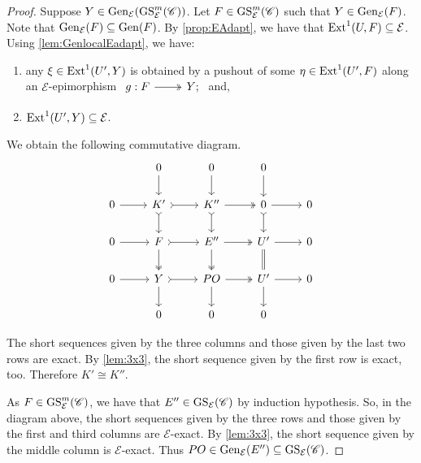 \begin{proof}
Suppose $Y \in \operatorname{Gen}_\mathcal{E}(\operatorname{GS}^{m}_{\mathcal{E}}(\mathscr{C}))$. Let $F \in \operatorname{GS}^{m}_{\mathcal{E}}(\mathscr{C})$ such that $Y \in \operatorname{Gen}_{\mathcal{E}}(F)$. Note that $\operatorname{Gen}_{\mathcal{E}}(F) \subseteq \operatorname{Gen}(F)$. By \cref{prop:EAdapt}, we have that $\operatorname{Ext}^1(U,F) \subseteq \mathcal{E}$. Using \cref{lem:GenlocalEadapt}, we have:
\begin{enumerate}[label=$\bullet$, itemsep=1mm]
    \item any $\xi \in \operatorname{Ext}^1(U',Y)$ is obtained by a pushout of some $\eta \in \operatorname{Ext}^1(U',F)$ along an $\mathcal{E}$-epimorphism $\begin{tikzcd}
	 g: F & Y;
	\arrow[two heads,from=1-1, to=1-2]
   \end{tikzcd}$ and,
   \item $\operatorname{Ext}^1(U',Y) \subseteq \mathcal{E}$.
\end{enumerate}
We obtain the following commutative diagram.
\[\begin{tikzcd}
         & 0 & 0 & 0 &  \\
	0 & K' & K''  & 0 &  0 \\
     0 & F & E'' & U' & 0 \\
      0 & Y & PO & U' & 0 \\
       & 0 & 0 & 0 & 
	\arrow[from=2-1, to=2-2]
	\arrow[tail, from=2-2, to=2-3]
	\arrow[two heads,from=2-3, to=2-4]
	\arrow[from=2-4, to=2-5]
        \arrow[from=3-1, to=3-2]
	\arrow[tail, from=3-2, to=3-3]
	\arrow[two heads,from=3-3, to=3-4]
	\arrow[from=3-4, to=3-5]
        \arrow[from=4-1, to=4-2]
	\arrow[tail, from=4-2, to=4-3]
	\arrow[two heads,from=4-3, to=4-4]
	\arrow[from=4-4, to=4-5]
        \arrow[from=4-2, to=5-2]
	\arrow[two heads, from=3-2, to=4-2]
	\arrow[tail,from=2-2, to=3-2]
	\arrow[from=1-2, to=2-2]
        \arrow[from=4-3, to=5-3]
	\arrow[two heads, from=3-3, to=4-3]
	\arrow[tail,from=2-3, to=3-3]
	\arrow[from=1-3, to=2-3]
        \arrow[from=4-4, to=5-4]
	\arrow[equals, from=3-4, to=4-4]
	\arrow[tail,from=2-4, to=3-4]
	\arrow[from=1-4, to=2-4]
\end{tikzcd} \]

The short sequences given by the three columns and those given by the last two rows are exact. By \cref{lem:3x3}, the short sequence given by the first row is exact, too. Therefore $K' \cong K''$.

As $F \in \operatorname{GS}^{m}_{\mathcal{E}}(\mathscr{C})$, we have that $E'' \in \operatorname{GS}_{\mathcal{E}}(\mathscr{C})$ by induction hypothesis. So, in the diagram above, the short sequences given by the three rows and those given by the first and third columns are $\mathcal{E}$-exact. By \cref{lem:3x3}, the short sequence given by the middle column is $\mathcal{E}$-exact. Thus $PO \in \operatorname{Gen}_\mathcal{E}(E'') \subseteq \operatorname{GS}_{\mathcal{E}}(\mathscr{C})$.


\end{proof}
